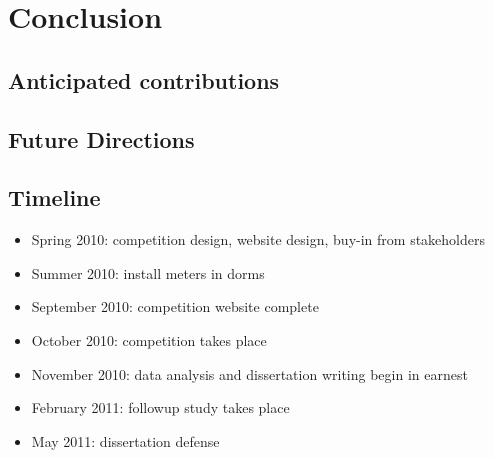 \chapter{Conclusion}


\section{Anticipated contributions}

\section{Future Directions}

\section{Timeline}

\begin{itemize}
\item Spring 2010: competition design, website design, buy-in from stakeholders
\item Summer 2010: install meters in dorms
\item September 2010: competition website complete
\item October 2010: competition takes place
\item November 2010: data analysis and dissertation writing begin in earnest
\item February 2011: followup study takes place
\item May 2011: dissertation defense
\end{itemize}
